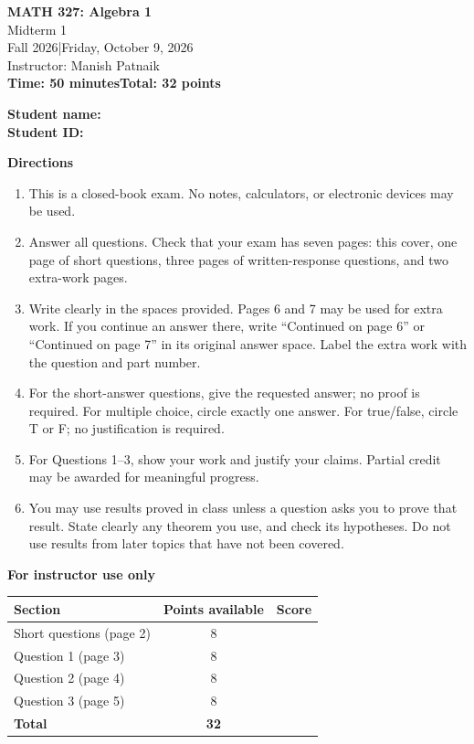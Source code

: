 \documentclass[11pt,letterpaper]{article}
\begin{document}
\thispagestyle{cover}
\begin{center}
{\LARGE\bfseries MATH 327: Algebra 1}\\[8pt]
{\Large Midterm 1}\\[8pt]
Fall 2026\quad |\quad Friday, October 9, 2026\\[4pt]
Instructor: Manish Patnaik\\[4pt]
\textbf{Time: 50 minutes\qquad Total: 32 points}
\end{center}
\vspace{0.35in}
\textbf{Student name:}\ \hrulefill\\[22pt]
\textbf{Student ID:}\ \hrulefill
\vspace{0.3in}

{\large\bfseries Directions}
\begin{enumerate}
\item This is a closed-book exam. No notes, calculators, or electronic devices may be used.
\item Answer all questions. Check that your exam has seven pages: this cover, one page of short questions, three pages of written-response questions, and two extra-work pages.
\item Write clearly in the spaces provided. Pages 6 and 7 may be used for extra work. If you continue an answer there, write ``Continued on page 6'' or ``Continued on page 7'' in its original answer space. Label the extra work with the question and part number.
\item For the short-answer questions, give the requested answer; no proof is required. For multiple choice, circle exactly one answer. For true/false, circle T or F; no justification is required.
\item For Questions 1--3, show your work and justify your claims. Partial credit may be awarded for meaningful progress.
\item You may use results proved in class unless a question asks you to prove that result. State clearly any theorem you use, and check its hypotheses. Do not use results from later topics that have not been covered.

\end{enumerate}
\vfill
\begin{center}
\textbf{For instructor use only}\\[9pt]
\renewcommand{\arraystretch}{1.6}
\begin{tabular}{|l|c|c|}
\hline
Section & Points available & Score \\ \hline
Short questions (page 2) & 8 & \hspace{0.65in} \\ \hline
Question 1 (page 3) & 8 & \\ \hline
Question 2 (page 4) & 8 & \\ \hline
Question 3 (page 5) & 8 & \\ \hline
\textbf{Total} & \textbf{32} & \\ \hline
\end{tabular}
\end{center}
\end{document}

